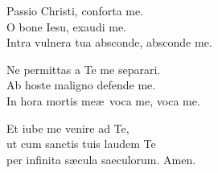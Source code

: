 

\spazio

\strofa Passio Christi, conforta me.\\
O bone Iesu, exaudi me.\\
Intra vulnera tua absconde, absconde me.

\spazio


\spazio

\strofa Ne permittas a Te me separari.\\
Ab hoste maligno defende me.\\
In hora mortis me\ae\ voca me, voca me.

\spazio


\spazio

\strofa Et iube me venire ad Te,\\
ut cum sanctis tuis laudem Te\\
per infinita s\ae cula saeculorum. Amen.

\spazio

